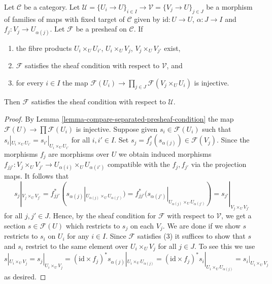 \begin{lemma}
\label{lemma-compare-sheaf-condition}
Let $\mathcal{C}$ be a category. Let $\mathcal{U} = \{U_i \to U\}_{i \in I} \to
\mathcal{V} = \{V_j \to U\}_{j \in J}$ be a morphism of families of maps
with fixed target of $\mathcal{C}$ given by $\text{id} : U \to U$,
$\alpha : J \to I$ and $f_j : V_j \to U_{\alpha(j)}$. Let $\mathcal{F}$
be a presheaf on $\mathcal{C}$. If
\begin{enumerate}
\item the fibre products $U_i \times_U U_{i'}$, $U_i \times_U V_j$,
$V_j \times_U V_{j'}$ exist,
\item $\mathcal{F}$ satisfies the sheaf condition with respect to
$\mathcal{V}$, and
\item for every $i \in I$ the map
$\mathcal{F}(U_i) \to \prod_{j \in J} \mathcal{F}(V_j \times_U U_i)$
is injective.
\end{enumerate}
Then $\mathcal{F}$ satisfies the sheaf condition with respect to $\mathcal{U}$.
\end{lemma}

\begin{proof}
By Lemma \ref{lemma-compare-separated-presheaf-condition} the map
$\mathcal{F}(U) \to \prod \mathcal{F}(U_i)$ is injective.
Suppose given
$s_i \in \mathcal{F}(U_i)$ such that $s_i|_{U_i \times_U U_{i'}}
= s_{i'}|_{U_i \times_U U_{i'}}$ for all $i, i' \in I$.
Set $s_j = f_j^*(s_{\alpha(j)}) \in \mathcal{F}(V_j)$.
Since the morphisms $f_j$ are morphisms over $U$ we obtain
induced morphisms $f_{jj'} : V_j \times_U V_{j'} \to
U_{\alpha(i)} \times_U U_{\alpha(i')}$ compatible with the
$f_j, f_{j'}$ via the projection maps. It follows that
$$
s_j|_{V_j \times_U V_{j'}}
= f_{jj'}^*(s_{\alpha(j)}|_{U_{\alpha(j)} \times_U U_{\alpha(j')}})
= f_{jj'}^*(s_{\alpha(j')}|_{U_{\alpha(j)} \times_U U_{\alpha(j')}})
= s_{j'}|_{V_j \times_U V_{j'}}
$$
for all $j, j' \in J$. Hence, by the sheaf condition
for $\mathcal{F}$ with respect to $\mathcal{V}$, we get a section
$s \in \mathcal{F}(U)$ which restricts to $s_j$ on each $V_j$.
We are done if we show $s$ restricts to $s_i$ on $U_i$
for any $i \in I$. Since $\mathcal{F}$ satisfies (3) it
suffices to show that $s$ and $s_i$ restrict to the
same element over $U_i \times_U V_j$ for all $j \in J$.
To see this we use
$$
s|_{U_i \times_U V_j} = s_j|_{U_i \times_U V_j} =
(\text{id} \times f_j)^*s_{\alpha(j)}|_{U_i \times_U U_{\alpha(j)}} =
(\text{id} \times f_j)^*s_i|_{U_i \times_U U_{\alpha(j)}} =
s_i|_{U_i \times_U V_j}
$$
as desired.
\end{proof}

